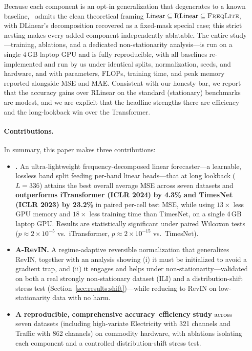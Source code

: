Because each component is an opt-in generalization that degenerates to a known
baseline, \method\ admits the clean theoretical framing
$\text{Linear} \subseteq \text{RLinear} \subseteq \textsc{FreqLite}$, with DLinear's
decomposition recovered as a fixed-mask special case; this strict nesting makes
every added component independently ablatable. The entire study---training,
ablations, and a dedicated non-stationarity analysis---is run on a single 4\,GB
laptop GPU and is fully reproducible, with all baselines re-implemented and run by
us under identical splits, normalization, seeds, and hardware, and with
parameters, FLOPs, training time, and peak memory reported alongside MSE and MAE.
Consistent with our honesty bar, we report that the accuracy gains over RLinear on
the standard (stationary) benchmarks are modest, and we are explicit that the
headline strengths there are efficiency and the long-lookback win over the
Transformer.

\paragraph{Contributions.} In summary, this paper makes three contributions:
\begin{itemize}
  \item \textbf{\method.} An ultra-lightweight frequency-decomposed linear
        forecaster---a learnable, lossless band split feeding per-band linear
        heads---that at long lookback ($L{=}336$) attains the best overall
        average MSE across seven datasets and \textbf{outperforms iTransformer
        (ICLR 2024) by 4.3\% and TimesNet (ICLR 2023) by 23.2\%} in paired
        per-cell test MSE, while using $13\times$ less GPU memory and
        $18\times$ less training time than TimesNet, on a single 4\,GB laptop GPU.
        Results are statistically significant under paired Wilcoxon tests
        ($p \approx 2\times10^{-5}$ vs.\ iTransformer, $p \approx 2\times10^{-15}$
        vs.\ TimesNet).
  \item \textbf{A-RevIN.} A regime-adaptive reversible normalization that
        generalizes RevIN, together with an analysis showing (i) it must be
        initialized to avoid a gradient trap, and (ii) it engages and helps under
        non-stationarity---validated on both a real strongly non-stationary
        dataset (ILI) and a distribution-shift stress test (Section~\ref{sec:results:shift})---while
        reducing to RevIN on low-stationarity data with no harm.
  \item \textbf{A reproducible, comprehensive accuracy--efficiency study} across
        seven datasets (including high-variate Electricity with 321 channels and
        Traffic with 862 channels) on commodity hardware, with ablations isolating
        each component and a controlled distribution-shift stress test.
\end{itemize}
